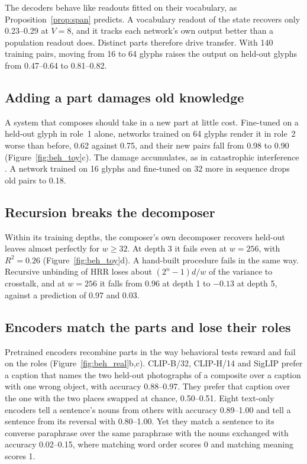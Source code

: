 \documentclass[10pt]{article}
\theoremstyle{plain}
\theoremstyle{remark}
\begin{document}
The decoders behave like readouts fitted on their vocabulary, as Proposition~\ref{prop:span} predicts. A vocabulary readout of the state recovers only 0.23--0.29 at $V = 8$, and it tracks each network's own output better than a population readout does. Distinct parts therefore drive transfer. With 140 training pairs, moving from 16 to 64 glyphs raises the output on held-out glyphs from 0.47--0.64 to 0.81--0.82.

\subsection{Adding a part damages old knowledge}
\label{sec:adding}

A system that composes should take in a new part at little cost. Fine-tuned on a held-out glyph in role~1 alone, networks trained on 64 glyphs render it in role~2 worse than before, 0.62 against 0.75, and their new pairs fall from 0.98 to 0.90 (Figure~\ref{fig:beh_toy}c). The damage accumulates, as in catastrophic interference \citep{mccloskey1989}. A network trained on 16 glyphs and fine-tuned on 32 more in sequence drops old pairs to 0.18.

\subsection{Recursion breaks the decomposer}
\label{sec:depth}

Within its training depths, the composer's own decomposer recovers held-out leaves almost perfectly for $w \ge 32$. At depth 3 it fails even at $w = 256$, with $R^2 = 0.26$ (Figure~\ref{fig:beh_toy}d). A hand-built procedure fails in the same way. Recursive unbinding of HRR loses about $(2^n - 1)d/w$ of the variance to crosstalk, and at $w = 256$ it falls from 0.96 at depth 1 to $-0.13$ at depth 5, against a prediction of 0.97 and 0.03.

\subsection{Encoders match the parts and lose their roles}
\label{sec:beh_encoders}

Pretrained encoders recombine parts in the way behavioral tests reward and fail on the roles (Figure~\ref{fig:beh_real}b,c). CLIP-B/32, CLIP-H/14 and SigLIP prefer a caption that names the two held-out photographs of a composite over a caption with one wrong object, with accuracy 0.88--0.97. They prefer that caption over the one with the two places swapped at chance, 0.50--0.51. Eight text-only encoders tell a sentence's nouns from others with accuracy 0.89--1.00 and tell a sentence from its reversal with 0.80--1.00. Yet they match a sentence to its converse paraphrase over the same paraphrase with the nouns exchanged with accuracy 0.02--0.15, where matching word order scores 0 and matching meaning scores 1.
\end{document}
